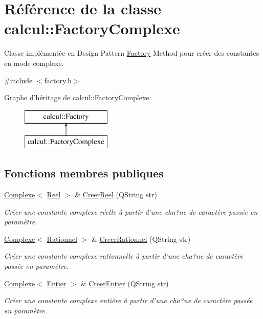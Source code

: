 \hypertarget{classcalcul_1_1_factory_complexe}{\section{Référence de la classe calcul\-:\-:Factory\-Complexe}
\label{classcalcul_1_1_factory_complexe}
}


Classe implémentée en Design Pattern \hyperlink{classcalcul_1_1_factory}{Factory} Method pour créer des constantes en mode complexe.  




{\ttfamily \#include $<$factory.\-h$>$}

Graphe d'héritage de calcul\-:\-:Factory\-Complexe\-:\begin{figure}[H]
\begin{center}
\leavevmode
\includegraphics[height=2.000000cm]{classcalcul_1_1_factory_complexe}
\end{center}
\end{figure}
\subsection*{Fonctions membres publiques}
\begin{DoxyCompactItemize}
\item 
\hyperlink{classcalcul_1_1_complexe}{Complexe}$<$ \hyperlink{classcalcul_1_1_reel}{Reel} $>$ \& \hyperlink{classcalcul_1_1_factory_complexe_a0b9ebb21e377742ccdd9a5e2dff08b75}{Creer\-Reel} (Q\-String str)
\begin{DoxyCompactList}\small\item\em Créer une constante complexe réelle à partir d'une cha?ne de caractère passée en paramètre. \end{DoxyCompactList}\item 
\hyperlink{classcalcul_1_1_complexe}{Complexe}$<$ \hyperlink{classcalcul_1_1_rationnel}{Rationnel} $>$ \& \hyperlink{classcalcul_1_1_factory_complexe_abbbaea83b424942d01505936c1c9e5b2}{Creer\-Rationnel} (Q\-String str)
\begin{DoxyCompactList}\small\item\em Créer une constante complexe rationnelle à partir d'une cha?ne de caractère passée en paramètre. \end{DoxyCompactList}\item 
\hyperlink{classcalcul_1_1_complexe}{Complexe}$<$ \hyperlink{classcalcul_1_1_entier}{Entier} $>$ \& \hyperlink{classcalcul_1_1_factory_complexe_ab895838ce6abdae50203bdfd491dbe9c}{Creer\-Entier} (Q\-String str)
\begin{DoxyCompactList}\small\item\em Créer une constante complexe entière à partir d'une cha?ne de caractère passée en paramètre. \end{DoxyCompactList}\end{DoxyCompactItemize}


